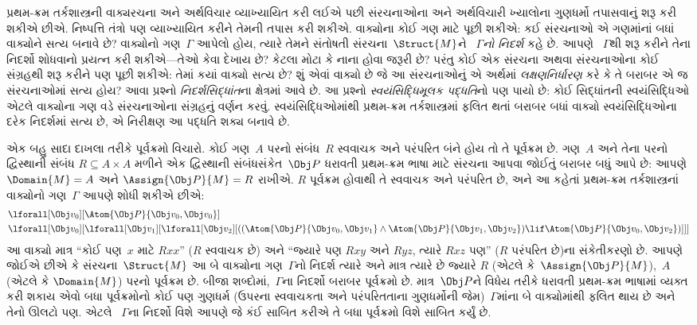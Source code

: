 પ્રથમ-ક્રમ તર્કશાસ્ત્રની વાક્યરચના અને અર્થવિચાર વ્યાખ્યાયિત કરી લઈએ
પછી સંરચનાઓના અને અર્થવિચારી ખ્યાલોના ગુણધર્મો તપાસવાનું શરૂ
કરી શકીએ છીએ. નિષ્પત્તિ તંત્રો પણ વ્યાખ્યાયિત કરીને તેમની તપાસ
કરી શકીએ. વાક્યોના કોઈ ગણ માટે પૂછી શકીએ: કઈ
સંરચનાઓ એ ગણમાંનાં બધાં વાક્યોને સત્ય બનાવે છે?
વાક્યોનો ગણ~$\Gamma$ આપેલો હોય, ત્યારે તેમને સંતોષતી
સંરચના~$\Struct{M}$ને \emph{~$\Gamma$નો નિદર્શ} કહે છે. આપણે
~$\Gamma$થી શરૂ કરીને તેના નિદર્શો શોધવાનો પ્રયત્ન કરી શકીએ---તેઓ
કેવા દેખાય છે? કેટલા મોટા કે નાના હોવા જરૂરી છે? પરંતુ કોઈ એક
સંરચના અથવા સંરચનાઓના કોઈ સંગ્રહથી શરૂ કરીને પણ પૂછી
શકીએ: તેમાં કયાં વાક્યો સત્ય છે? શું એવાં વાક્યો છે જે
આ સંરચનાઓનું એ અર્થમાં \emph{લક્ષણનિર્ધારણ} કરે કે તે બરાબર
એ જ સંરચનાઓમાં સત્ય હોય? આવા પ્રશ્નો \emph{નિદર્શસિદ્ધાંત}ના ક્ષેત્રમાં
આવે છે. આ પ્રશ્નો \emph{સ્વયંસિદ્ધિમૂલક પદ્ધતિ}નો પણ પાયો છે: કોઈ
સિદ્ધાંતની સ્વયંસિદ્ધિઓ એટલે વાક્યોના ગણ વડે
સંરચનાઓના સંગ્રહનું વર્ણન કરવું. સ્વયંસિદ્ધિઓમાંથી પ્રથમ-ક્રમ
તર્કશાસ્ત્રમાં ફલિત થતાં બરાબર બધાં વાક્યો સ્વયંસિદ્ધિઓના
દરેક નિદર્શમાં સત્ય છે, એ નિરીક્ષણ આ પદ્ધતિ શક્ય બનાવે છે.

એક બહુ સાદા દાખલા તરીકે પૂર્વક્રમો વિચારો. કોઈ ગણ~$A$ પરનો સંબંધ~$R$
સ્વવાચક અને પરંપરિત બંને હોય તો તે પૂર્વક્રમ છે. ગણ~$A$ અને તેના
પરનો દ્વિસ્થાની સંબંધ $R \subseteq A \times A$ મળીને એક દ્વિસ્થાની
સંબંધસંકેત~$\Obj P$ ધરાવતી પ્રથમ-ક્રમ ભાષા માટે સંરચના આપવા
જોઈતું બરાબર બધું આપે છે: આપણે $\Domain{M} = A$ અને
$\Assign{\Obj P}{M} = R$ રાખીએ. $R$ પૂર્વક્રમ હોવાથી તે સ્વવાચક અને
પરંપરિત છે, અને આ કહેતાં પ્રથમ-ક્રમ તર્કશાસ્ત્રનાં વાક્યોનો
ગણ~$\Gamma$ આપણે શોધી શકીએ છીએ:
\begin{align*}
  & \lforall[\Obj v_0][\Atom{\Obj P}{\Obj v_0,\Obj v_0}]\\
  & \lforall[\Obj v_0][\lforall[\Obj v_1][\lforall[\Obj v_2][((\Atom{\Obj P}{\Obj v_0,\Obj v_1} \land \Atom{\Obj P}{\Obj v_1,\Obj v_2}) \lif \Atom{\Obj P}{\Obj v_0,\Obj v_2})]]]
\end{align*}
આ વાક્યો માત્ર ``કોઈ પણ~$x$ માટે $Rxx$'' ($R$ સ્વવાચક છે) અને
``જ્યારે પણ $Rxy$ અને $Ryz$, ત્યારે $Rxz$ પણ'' ($R$ પરંપરિત છે)ના
સંકેતીકરણો છે. આપણે જોઈએ છીએ કે સંરચના~$\Struct{M}$ આ બે
વાક્યોના ગણ~$\Gamma$નો નિદર્શ ત્યારે અને માત્ર ત્યારે છે
જ્યારે $R$ (એટલે કે~$\Assign{\Obj P}{M}$),~$A$ (એટલે કે
$\Domain{M}$) પરનો પૂર્વક્રમ છે. બીજા શબ્દોમાં,~$\Gamma$ના નિદર્શો
બરાબર પૂર્વક્રમો છે. માત્ર~$\Obj P$ને વિધેય તરીકે ધરાવતી
પ્રથમ-ક્રમ ભાષામાં વ્યક્ત કરી શકાય એવો બધા પૂર્વક્રમોનો કોઈ પણ
ગુણધર્મ (ઉપરના સ્વવાચકતા અને પરંપરિતતાના ગુણધર્મોની જેમ)~$\Gamma$માંના
બે વાક્યોમાંથી ફલિત થાય છે અને તેનો ઊલટો પણ. એટલે
~$\Gamma$ના નિદર્શો વિશે આપણે જે કંઈ સાબિત કરીએ તે બધા પૂર્વક્રમો
વિશે સાબિત કર્યું છે.

